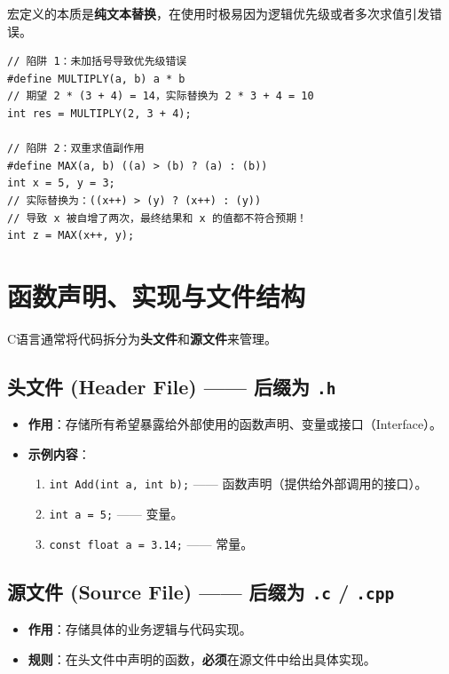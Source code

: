 宏定义的本质是\textbf{纯文本替换}，在使用时极易因为逻辑优先级或者多次求值引发错误。

\begin{lstlisting}[caption={宏定义陷阱示例}]
// 陷阱 1：未加括号导致优先级错误
#define MULTIPLY(a, b) a * b
// 期望 2 * (3 + 4) = 14，实际替换为 2 * 3 + 4 = 10
int res = MULTIPLY(2, 3 + 4); 

// 陷阱 2：双重求值副作用
#define MAX(a, b) ((a) > (b) ? (a) : (b))
int x = 5, y = 3;
// 实际替换为：((x++) > (y) ? (x++) : (y))
// 导致 x 被自增了两次，最终结果和 x 的值都不符合预期！
int z = MAX(x++, y); 
\end{lstlisting}

\newpage

\section{函数声明、实现与文件结构}

C语言通常将代码拆分为\textbf{头文件}和\textbf{源文件}来管理。

\subsection{头文件 (Header File) —— 后缀为 \texttt{.h}}

\begin{itemize}
    \item \textbf{作用}：存储所有希望暴露给外部使用的函数声明、变量或接口（Interface）。
    \item \textbf{示例内容}：
    \begin{enumerate}
        \item \texttt{int Add(int a, int b);} —— 函数声明（提供给外部调用的接口）。
        \item \texttt{int a = 5;} —— 变量。
        \item \texttt{const float a = 3.14;} —— 常量。
    \end{enumerate}
\end{itemize}

\subsection{源文件 (Source File) —— 后缀为 \texttt{.c} / \texttt{.cpp}}

\begin{itemize}
    \item \textbf{作用}：存储具体的业务逻辑与代码实现。
    \item \textbf{规则}：在头文件中声明的函数，\textbf{必须}在源文件中给出具体实现。
\end{itemize}

